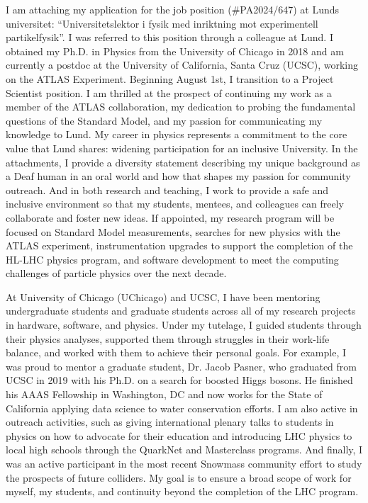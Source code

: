 
I am attaching my application for the job position (\#PA2024/647) at Lunds universitet: \enquote{Universitetslektor i fysik med inriktning mot experimentell partikelfysik}. I was referred to this position through a colleague at Lund. I obtained my Ph.D. in Physics from the University of Chicago in 2018 and am currently a postdoc at the University of California, Santa Cruz (UCSC), working on the ATLAS Experiment. Beginning August 1st, I transition to a Project Scientist position. I am thrilled at the prospect of continuing my work as a member of the ATLAS collaboration, my dedication to probing the fundamental questions of the Standard Model, and my passion for communicating my knowledge to Lund. My career in physics represents a commitment to the core value that Lund shares: widening participation for an inclusive University. In the attachments, I provide a diversity statement describing my unique background as a Deaf human in an oral world and how that shapes my passion for community outreach. And in both research and teaching, I work to provide a safe and inclusive environment so that my students, mentees, and colleagues can freely collaborate and foster new ideas. If appointed, my research program will be focused on Standard Model measurements, searches for new physics with the ATLAS experiment, instrumentation upgrades to support the completion of the HL-LHC physics program, and software development to meet the computing challenges of particle physics over the next decade.

At University of Chicago (UChicago) and UCSC, I have been mentoring undergraduate students and graduate students across all of my research projects in hardware, software, and physics. Under my tutelage, I guided students through their physics analyses, supported them through struggles in their work-life balance, and worked with them to achieve their personal goals. For example, I was proud to mentor a graduate student, Dr. Jacob Pasner, who graduated from UCSC in 2019 with his Ph.D. on a search for boosted Higgs bosons. He finished his AAAS Fellowship in Washington, DC and now works for the State of California applying data science to water conservation efforts. I am also active in outreach activities, such as giving international plenary talks to students in physics on how to advocate for their education and introducing LHC physics to local high schools through the QuarkNet and Masterclass programs. And finally, I was an active participant in the most recent Snowmass community effort to study the prospects of future colliders. My goal is to ensure a broad scope of work for myself, my students, and continuity beyond the completion of the LHC program.


